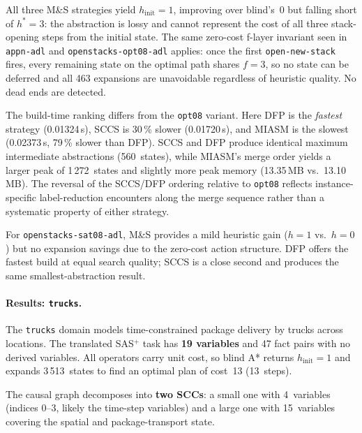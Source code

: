 \documentclass[11pt,a4paper]{article}
\begin{document}
All three M\&S strategies yield $h_{\mathrm{init}} = 1$, improving over
blind's~0 but falling short of $h^* = 3$: the abstraction is lossy and cannot
represent the cost of all three stack-opening steps from the initial state.
The same zero-cost f-layer invariant seen in \texttt{appn-adl} and
\texttt{openstacks-opt08-adl} applies: once the first \texttt{open-new-stack}
fires, every remaining state on the optimal path shares $f = 3$, so no state
can be deferred and all 463 expansions are unavoidable regardless of heuristic
quality.
No dead ends are detected.

The build-time ranking differs from the \texttt{opt08} variant.
Here DFP is the \emph{fastest} strategy (0.01324\,s), SCCS is 30\,\%
slower (0.01720\,s), and MIASM is the slowest (0.02373\,s, 79\,\% slower
than DFP).
SCCS and DFP produce identical maximum intermediate abstractions (560~states),
while MIASM's merge order yields a larger peak of 1\,272~states and slightly
more peak memory (13.35\,MB vs.\ 13.10\,MB).
The reversal of the SCCS/DFP ordering relative to \texttt{opt08} reflects
instance-specific label-reduction encounters along the merge sequence rather
than a systematic property of either strategy.

For \texttt{openstacks-sat08-adl}, M\&S provides a mild heuristic gain
($h=1$ vs.\ $h=0$) but no expansion savings due to the zero-cost action
structure.
DFP offers the fastest build at equal search quality; SCCS is a close
second and produces the same smallest-abstraction result.

\paragraph{Results: \texttt{trucks}.}

The \texttt{trucks} domain models time-constrained package delivery by trucks
across locations.
The translated SAS$^+$ task has \textbf{19 variables} and 47 fact pairs with
no derived variables.
All operators carry unit cost, so blind A* returns $h_{\mathrm{init}} = 1$
and expands 3\,513~states to find an optimal plan of cost~13 (13~steps).

The causal graph decomposes into \textbf{two SCCs}: a small one with
4~variables (indices 0--3, likely the time-step variables) and a large one
with 15~variables covering the spatial and package-transport state.
\end{document}
